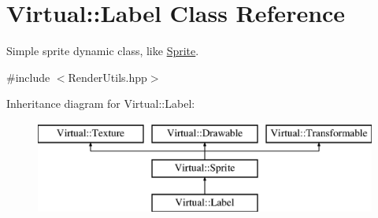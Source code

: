 \hypertarget{class_virtual_1_1_label}{}\section{Virtual\+:\+:Label Class Reference}
\label{class_virtual_1_1_label}


Simple sprite dynamic class, like \hyperlink{class_virtual_1_1_sprite}{Sprite}.  




{\ttfamily \#include $<$Render\+Utils.\+hpp$>$}

Inheritance diagram for Virtual\+:\+:Label\+:\begin{figure}[H]
\begin{center}
\leavevmode
\includegraphics[height=3.000000cm]{class_virtual_1_1_label}
\end{center}
\end{figure}
